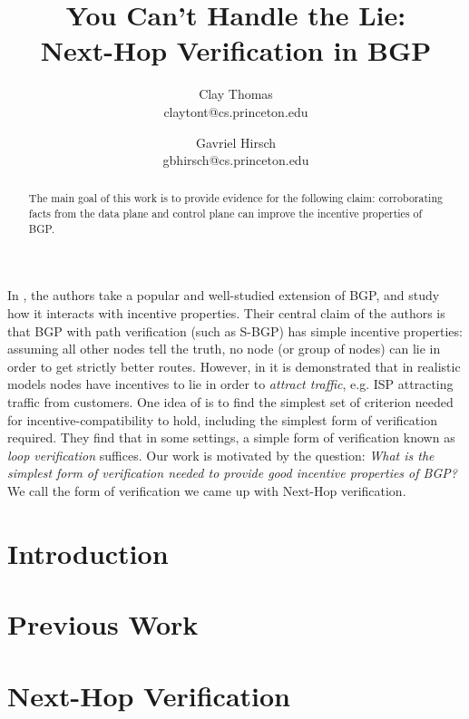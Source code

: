 \documentclass[12pt]{article}
\begin{document}

\title{
  You Can't Handle the Lie: \\
  Next-Hop Verification in BGP
}
\author{
  Clay Thomas\\ claytont@cs.princeton.edu
  \and 
  Gavriel Hirsch\\ gbhirsch@cs.princeton.edu 
}
\maketitle

\begin{abstract}
  The main goal of this work is to provide evidence for the following
  claim: corroborating facts from the data plane and control plane
  can improve the incentive properties of BGP.
\end{abstract}

  In \cite{RoutingGames}, the authors take a popular
  and well-studied extension of BGP,
  and study how it interacts with incentive properties.
  Their central claim of the authors is
  that BGP with path verification (such as S-BGP) has
  simple incentive properties: assuming all other nodes tell the truth,
  no node (or group of nodes) can lie in order to get strictly better routes.
  However, in \cite{Attraction} it is demonstrated that in realistic models
  nodes have incentives to lie in order to \emph{attract traffic}, e.g.
  ISP attracting traffic from customers.
  One idea of \cite{Attraction} is to find the simplest set of criterion
  needed for incentive-compatibility to hold, including the
  simplest form of verification required.
  They find that in some settings, a simple form of verification known
  as \emph{loop verification} suffices.
  Our work is motivated by the question:
  \emph{What is the simplest form of verification needed to provide
  good incentive properties of BGP?}
  We call the form of verification we came up with Next-Hop verification.


\section{Introduction}
\section{Previous Work}
\section{Next-Hop Verification}
\end{document}
